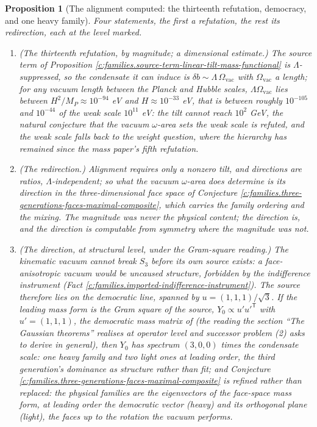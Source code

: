 \documentclass[11pt]{article}
\newtheorem{proposition}[theorem]{Proposition}
\theoremstyle{definition}
\theoremstyle{plain}
\begin{document}
\begin{proposition}[The alignment computed: the thirteenth refutation, democracy, and one heavy family]\label{c:families.alignment-computed-thirteenth-refutation-democracy-one}
Four statements, the first a refutation, the rest its redirection, each at the level marked.
\begin{enumerate}
\item \emph{(The thirteenth refutation, by magnitude; a dimensional estimate.)} The source term of Proposition \ref{c:families.source-term-linear-tilt-mass-functional} is $\Lambda$-suppressed, so the condensate it can induce is $\delta b \sim \Lambda\,\Omega_{\mathrm{vac}}$ with $\Omega_{\mathrm{vac}}$ a length; for any vacuum length between the Planck and Hubble scales, $\Lambda\Omega_{\mathrm{vac}}$ lies between $H^{2}/M_{P} \approx 10^{-94}$ eV and $H \approx 10^{-33}$ eV, that is between roughly $10^{-105}$ and $10^{-44}$ of the weak scale $10^{11}$ eV: the tilt cannot reach $10^{2}$ GeV, the natural conjecture that the vacuum $\omega$-area sets the weak scale is refuted, and the weak scale falls back to the weight question, where the hierarchy has remained since the mass paper's fifth refutation.
\item \emph{(The redirection.)} Alignment requires only a nonzero tilt, and directions are ratios, $\Lambda$-independent; so what the vacuum $\omega$-area does determine is its \emph{direction} in the three-dimensional face space of Conjecture \ref{c:families.three-generations-faces-maximal-composite}, which carries the family ordering and the mixing. The magnitude was never the physical content; the direction is, and the direction is computable from symmetry where the magnitude was not.
\item \emph{(The direction, at structural level, under the Gram-square reading.)} The kinematic vacuum cannot break $S_{3}$ before its own source exists: a face-anisotropic vacuum would be uncaused structure, forbidden by the indifference instrument (Fact \ref{c:families.imported-indifference-instrument}). The source therefore lies on the democratic line, spanned by $u = (1,1,1)/\sqrt{3}$. If the leading mass form is the Gram square of the source, $Y_{0} \propto u' u'^{\mathsf{T}}$ with $u' = (1,1,1)$, the democratic mass matrix of \cite{HHW1978} (the reading the section ``The Gaussian theorems'' realises at operator level and successor problem (2) asks to derive in general), then $Y_{0}$ has spectrum $(3, 0, 0)$ times the condensate scale: one heavy family and two light ones at leading order, the third generation's dominance as structure rather than fit; and Conjecture \ref{c:families.three-generations-faces-maximal-composite} is refined rather than replaced: the physical families are the \emph{eigenvectors} of the face-space mass form, at leading order the democratic vector (heavy) and its orthogonal plane (light), the faces up to the rotation the vacuum performs.

\end{enumerate}
\end{proposition}
\end{document}
